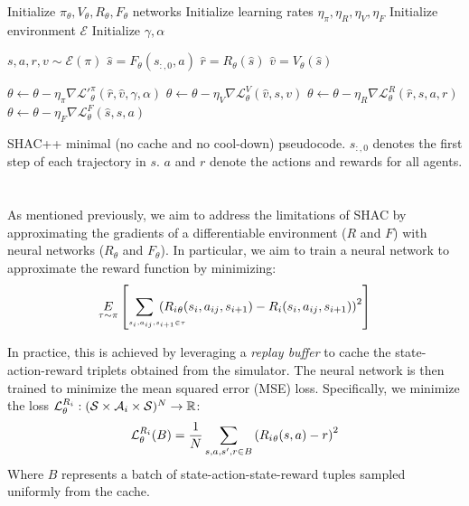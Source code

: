 \begin{algorithm}[t]
    \begin{algorithmic}[1]
    \STATE Initialize $\pi_\theta,V_\theta,R_\theta,F_\theta$ networks
    \STATE Initialize learning rates $\eta_\pi, \eta_R, \eta_V, \eta_F$
    \STATE Initialize environment $\mathcal{E}$
    \STATE Initialize $\gamma, \alpha$
    
        
        \STATE $s,a,r,v \sim \mathcal{E}(\pi)$
        \STATE $\hat{s} = F_\theta(s_{:,0}, a)$
        \STATE $\hat{r} = R_\theta(\hat{s})$
        \STATE $\hat{v} = V_\theta(\hat{s})$
        
        \STATE $\theta \gets \theta - \eta_\pi \nabla \mathcal{L'}^\pi_\theta(\hat{r},\hat{v},\gamma,\alpha)$
        \STATE $\theta \gets \theta - \eta_V \nabla \mathcal{L}^V_\theta(\hat{v},s,v)$
        \STATE $\theta \gets \theta - \eta_R \nabla \mathcal{L}^R_\theta(\hat{r},s,a,r)$
        \STATE $\theta \gets \theta - \eta_F \nabla \mathcal{L}^F_\theta(\hat{s},s,a)$
    
    \ENDFOR
    
    \end{algorithmic}
    \caption{SHAC++ minimal (no cache and no cool-down) pseudocode. $s_{:,0}$ denotes the first step of each trajectory in $s$. $a$ and $r$ denote the actions and rewards for all agents.}
    \label{alg:shacpp}
\end{algorithm}


\section{\fname{}}

As mentioned previously, we aim to address the limitations of SHAC by approximating the gradients of a differentiable environment ($R$ and $F$) with neural networks ($R_\theta$ and $F_\theta$). In particular, we aim to train a neural network to approximate the reward function by minimizing: 
\begin{align*}
    \underset{\tau\sim\pi}{E}\left[\hspace{-.7cm}\sum_{\hspace{.7cm}\scriptscriptstyle s_i,a_{ij},s_{i+1}\in\tau} \hspace{-.8cm}\left( {\rewards{i}}_\theta(s_i, a_{ij}, s_{i+1}) -\rewards{i}(s_i, a_{ij}, s_{i+1}) \right)^2\right] 
\end{align*}

In practice, this is achieved by leveraging a \emph{replay buffer} to cache the state-action-reward triplets obtained from the simulator. The neural network is then trained to minimize the mean squared error (MSE) loss. Specifically, we minimize the loss $\mathcal{L}_\theta^{R_{i}}:(\mathcal{S}\times\mathcal{A}_{i}\times\mathcal{S})^N\rightarrow\mathbb{R}$:
$$ \mathcal{L}_\theta^{R_{i}}(B) = \frac{1}{N}\sum_{s,a,s',r \in B}\left( {R_{i}}_\theta(s, a) - r \right)^2 $$
Where $B$ represents a batch of state-action-state-reward tuples sampled uniformly from the cache.

